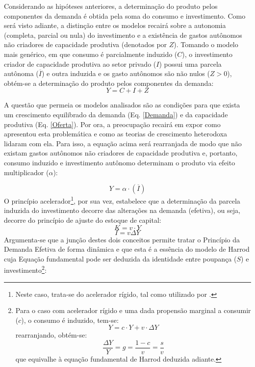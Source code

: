 Considerando as hipóteses anteriores, a determinação do produto pelos componentes da demanda é obtida pela soma do consumo e investimento. Como será visto adiante, a distinção entre os modelos recairá sobre a autonomia (completa, parcial ou nula) do investimento e a existência de gastos autônomos não criadores de capacidade produtiva (denotados por $Z$). Tomando o modelo mais genérico, em que consumo é parcialmente induzido ($C$), o investimento criador de capacidade produtiva ao setor privado ($I$) possui uma parcela autônoma ($\overline I$) e outra induzida e os gasto autônomos são não nulos ($Z > 0$), obtém-se a determinação do produto pelos componentes da demanda:
\begin{equation}
\label{Demanda}
    Y = C + I + Z
\end{equation}

A questão que permeia os modelos analisados são as condições para que exista um crescimento equilibrado da demanda (Eq. \ref{Demanda}) e da capacidade produtiva (Eq. \ref{Oferta}). Por ora, a preocupação recairá em expor como \textcite{harrod_essay_1939} apresentou esta problemática e como as teorias de crescimento heterodoxa lidaram com ela. Para isso, a equação acima será rearranjada de modo que não existam gastos autônomos não criadores de capacidade produtiva e, portanto, consumo induzido e investimento autônomo determinam o produto via efeito multiplicador ($\alpha$):

\begin{equation}
    Y = \alpha\cdot (\overline I)
\end{equation}
O princípio acelerador\footnote{Neste caso, trata-se do acelerador rígido, tal como utilizado por \textcite{harrod_essay_1939}.}, por sua vez, estabelece que a determinação da parcela induzida do investimento decorre das alterações na demanda (efetiva), ou seja, decorre do princípio de ajuste do estoque de capital:
$$
K = v\cdot Y
$$
\begin{equation}
    I = v\Delta Y
\end{equation}
Argumenta-se que a junção destes dois conceitos permite tratar o Princípio da Demanda Efetiva de forma dinâmica e que esta é a essência do modelo de Harrod cuja Equação fundamental pode ser deduzida da identidade entre poupança ($S$) e investimento\footnote{Para o caso com acelerador rígido e uma dada propensão marginal a consumir ($c$), o consumo é induzido, tem-se:
$$
Y = c\cdot Y + v\cdot \Delta Y
$$
rearranjando, obtém-se:
$$
\frac{\Delta Y}{Y} = g = \frac{1 - c}{v} = \frac{s}{v}
$$
que equivalhe à equação fundamental de Harrod deduzida adiante.
}:


